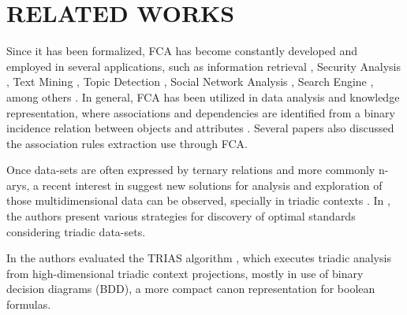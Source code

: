 \documentclass[a4paper,twoside]{article}
\begin{document}
\section{\uppercase{Related works}}

Since it has been formalized, FCA has become constantly developed and employed in several applications, such as information retrieval \cite{Kumar2012}, Security Analysis \cite{Poelmans2013}, Text Mining \cite{DeMaio2014}, Topic Detection \cite{Cigarran2016}, Social Network Analysis \cite{MissaouiSergei2017}, Search Engine \cite{Negm2017}, among others \cite{Singh2011}. In general, FCA has been utilized in data analysis and knowledge representation, where associations and dependencies are identified from a binary incidence relation between objects and attributes \cite{c01,c10}. Several papers \cite{Disc1998,u07,u59,u50} also discussed the association rules extraction use through FCA.

Once data-sets are often expressed by ternary relations and more commonly n-arys, a recent interest in suggest new solutions for analysis and exploration of those multidimensional data can be observed, specially in triadic contexts \cite{Bazin2020,Felde2021}. In \cite{trias01}, the authors present various strategies for discovery of optimal standards considering triadic data-sets.

In \cite{kaio:21} the authors evaluated the TRIAS algorithm \cite{Trias}, which executes triadic analysis from high-dimensional triadic context projections, mostly in use of binary decision diagrams (BDD), a more compact canon representation for boolean formulas.
\end{document}
